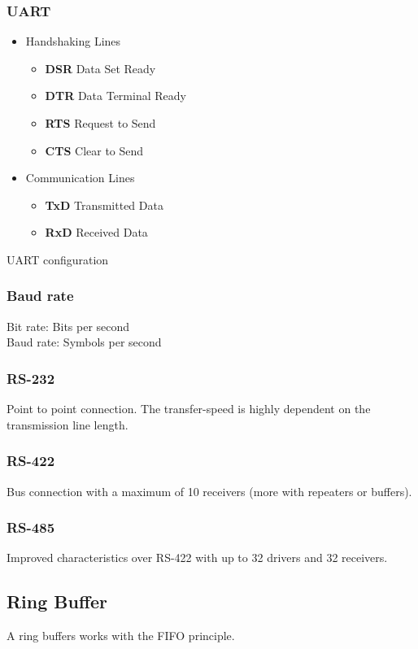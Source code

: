 \subsubsection{UART }
\begin{itemize}
	\itemsep-.5em
	\item Handshaking Lines 
	\begin{itemize}
		\itemsep-.5em 
		\item \textbf{DSR} Data Set Ready
		\item \textbf{DTR} Data Terminal Ready
		\item \textbf{RTS} Request to Send
		\item \textbf{CTS} Clear to Send
	\end{itemize}
	\item Communication Lines
	\begin{itemize}
		\itemsep-.5em
		\item \textbf{TxD} Transmitted Data
		\item \textbf{RxD} Received Data
	\end{itemize}
\end{itemize}

UART configuration 


\subsubsection{Baud rate}
Bit rate: Bits per second\\
Baud rate: Symbols per second

\subsubsection{RS-232 }
Point to point connection.
The transfer-speed is highly dependent on the transmission line length.

\subsubsection{RS-422}
Bus connection with a maximum of 10 receivers (more with repeaters or buffers).

\subsubsection{RS-485}
Improved characteristics over RS-422 with up to 32 drivers and 32 receivers.

\subsection{Ring Buffer}
A ring buffers works with the FIFO principle.

